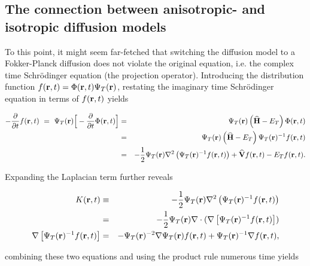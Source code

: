 \subsection{The connection between anisotropic- and isotropic diffusion models}
\label{sec:ConnectAnisIs}

To this point, it might seem far-fetched that switching the diffusion model to a Fokker-Planck diffusion does not violate the original equation, i.e. the complex time Schrödinger equation (the projection operator). Introducing the distribution function $f(\mathbf{r}, t) = \Phi(\mathbf{r}, t)\Psi_T(\mathbf{r})$, restating the imaginary time Schrödinger equation in terms of $f(\mathbf{r}, t)$ yields

\begin{eqnarray}
-\frac{\partial}{\partial t}f(\mathbf{r}, t)\,\, = \,\,\Psi_T(\mathbf{r})\Big[-\frac{\partial}{\partial t}\Phi(\mathbf{r}, t)\Big] &=& \Psi_T(\mathbf{r})\left({\bf\widehat{H}} - E_T\right)\Phi(\mathbf{r}, t) \nonumber\\
         &=& \Psi_T(\mathbf{r})\left({\bf\widehat{H}} - E_T\right)\Psi_T(\mathbf{r})^{-1}f(\mathbf{r}, t) \label{eq:impSamplRaw}\\
         &=& -\frac{1}{2}\Psi_T(\mathbf{r})\nabla^2 \left(\Psi_T(\mathbf{r})^{-1}f(\mathbf{r}, t)\right) + {\bf\widehat{V}}f(\mathbf{r}, t) - E_Tf(\mathbf{r},t).\nonumber
\end{eqnarray}

Expanding the Laplacian term further reveals

\begin{eqnarray}
K(\mathbf{r}, t) &\equiv& -\frac{1}{2}\Psi_T(\mathbf{r})\nabla^2 \left(\Psi_T(\mathbf{r})^{-1}f(\mathbf{r}, t)\right) \nonumber\\
 &=& -\frac{1}{2}\Psi_T(\mathbf{r})\nabla\cdot (\nabla\left[\Psi_T(\mathbf{r})^{-1}f(\mathbf{r}, t)\right]) \\
\nabla\left[\Psi_T(\mathbf{r})^{-1}f(\mathbf{r}, t)\right] &=& -\Psi_T(\mathbf{r})^{-2}\nabla \Psi_T(\mathbf{r}) f(\mathbf{r}, t) + \Psi_T(\mathbf{r})^{-1}\nabla f(\mathbf{r}, t),
\end{eqnarray}

combining these two equations and using the product rule numerous time yields


